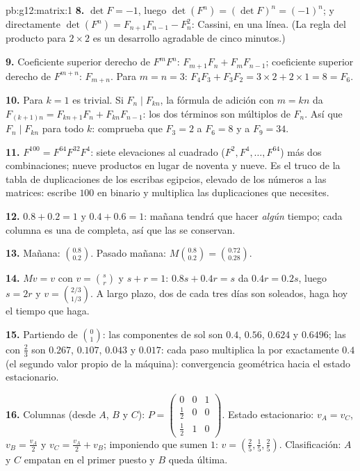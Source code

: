 \begin{solution}{pb:g12:matrix:1}
\textbf{8.} $\det F = -1$, luego $\det(F^n) = (\det F)^n = (-1)^n$; y
directamente $\det(F^n) = F_{n+1}F_{n-1} - F_n^2$: Cassini, en una línea.
(La regla del producto para  $2 \times 2$ es un desarrollo
agradable de cinco minutos.)

\textbf{9.} Coeficiente superior derecho de $F^m F^n$:
$F_{m+1}F_n + F_m F_{n-1}$; coeficiente superior derecho de $F^{m+n}$:
$F_{m+n}$. Para $m = n = 3$:
$F_4 F_3 + F_3 F_2 = 3 \times 2 + 2 \times 1 = 8 = F_6$.

\textbf{10.} Para $k = 1$ es trivial. Si $F_n \mid F_{kn}$, la fórmula de
adición con $m = kn$ da
$F_{(k+1)n} = F_{kn+1}F_n + F_{kn}F_{n-1}$: los dos términos son múltiplos
de $F_n$. Así que $F_n \mid F_{kn}$ para todo $k$: comprueba que
$F_3 = 2$  a $F_6 = 8$ y a $F_9 = 34$.

\textbf{11.} $F^{100} = F^{64} F^{32} F^4$: siete elevaciones al cuadrado
($F^2, F^4, \dots, F^{64}$) más dos combinaciones; nueve productos en lugar
de noventa y nueve. Es el truco de la tabla de duplicaciones de los
escribas egipcios, elevado de los números a las matrices: escribe $100$ en
binario y multiplica las duplicaciones que necesites.

\textbf{12.} $0.8 + 0.2 = 1$ y $0.4 + 0.6 = 1$: mañana tendrá que hacer
\emph{algún} tiempo; cada columna es una  de 
completa, así que las  se conservan.

\textbf{13.} Mañana: $\binom{0.8}{0.2}$. Pasado mañana:
$M\binom{0.8}{0.2} = \binom{0.72}{0.28}$.

\textbf{14.} $Mv = v$ con $v = \binom{s}{r}$ y $s + r = 1$:
$0.8s + 0.4r = s$ da $0.4r = 0.2s$, luego $s = 2r$ y
$v = \binom{2/3}{1/3}$. A largo plazo, dos de cada tres días son soleados,
haga hoy el tiempo que haga.

\textbf{15.} Partiendo de $\binom01$: las componentes de sol son $0.4$,
$0.56$, $0.624$ y $0.6496$; las  con $\frac23$ son $0.267$,
$0.107$, $0.043$ y $0.017$: cada paso multiplica la  por
exactamente $0.4$ (el segundo valor propio de la máquina): convergencia
geométrica hacia el estado estacionario.

\textbf{16.} Columnas (desde $A$, $B$ y $C$):
$P = \begin{pmatrix} 0 & 0 & 1\\ \frac12 & 0 & 0\\
\frac12 & 1 & 0\end{pmatrix}$. Estado estacionario: $v_A = v_C$,
$v_B = \frac{v_A}{2}$ y $v_C = \frac{v_A}{2} + v_B$; imponiendo que sumen
$1$: $v = \left(\frac25, \frac15, \frac25\right)$. Clasificación: $A$ y $C$
empatan en el primer puesto y $B$ queda última.


\end{solution}
